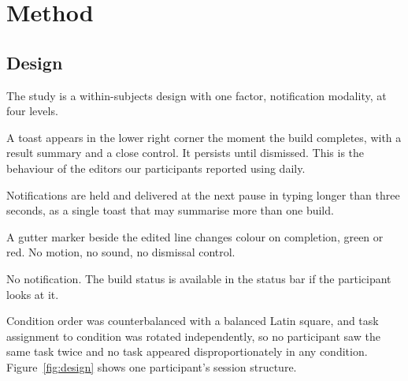 \section{Method}
\label{sec:method}

\subsection{Design}

The study is a within-subjects design with one factor, notification modality,
at four levels.

\begin{description}[itemsep=1pt,topsep=2pt,font=\normalfont\itshape]
  \item[Immediate.] A toast appears in the lower right corner the moment the
    build completes, with a result summary and a close control. It persists
    until dismissed. This is the behaviour of the editors our participants
    reported using daily.
  \item[Batched.] Notifications are held and delivered at the next pause in
    typing longer than three seconds, as a single toast that may summarise more
    than one build.
  \item[Ambient.] A gutter marker beside the edited line changes colour on
    completion, green or red. No motion, no sound, no dismissal control.
  \item[Silent.] No notification. The build status is available in the status
    bar if the participant looks at it.
\end{description}

Condition order was counterbalanced with a balanced Latin square, and task
assignment to condition was rotated independently, so no participant saw the
same task twice and no task appeared disproportionately in any condition.
Figure~\ref{fig:design} shows one participant's session structure.

